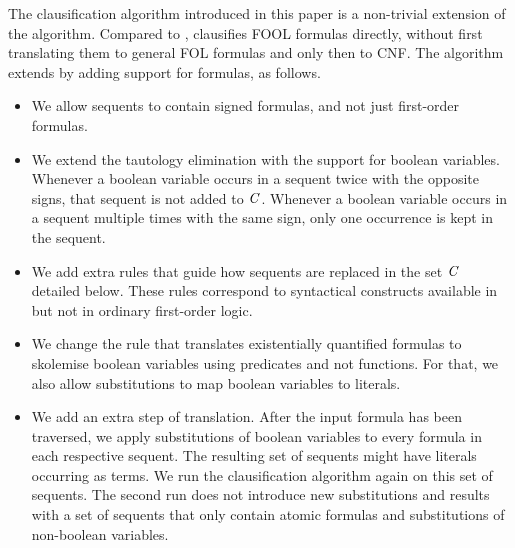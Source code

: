 The \nfcnf{} clausification algorithm introduced in this paper is a non-trivial extension of the \newcnf{} algorithm. 
Compared to \oldcnf{}, %
\nfcnf{} 
clausifies FOOL formulas directly, without first translating them to general FOL formulas and only then to CNF. 
The \nfcnf{} algorithm   extends \newcnf{} by adding support for \folb{} formulas, as follows. 
\begin{itemize}
  \item We allow sequents to contain signed \folb{} formulas, and not just first-order formulas.
  \item We extend the \newcnf{} tautology elimination with the support for boolean variables. Whenever a boolean variable occurs in a sequent twice with the opposite signs, that sequent is not added to $\mathit{C}$. Whenever a boolean variable occurs in a sequent multiple times with the same sign, only one occurrence is kept in the sequent.
  \item We add extra rules that guide how sequents are replaced in the set $\mathit{C}$ detailed below. These rules correspond to syntactical constructs available in \folb{} but not in ordinary first-order logic.
  \item We change the rule that translates existentially quantified formulas to sko\-le\-mi\-se boolean variables using \skolem{} predicates and not \skolem{} functions. For that, we also allow substitutions to map boolean variables to \skolem{} literals. 
  \item We add an extra step of translation. After the input formula has been traversed, we apply substitutions of boolean variables to every formula in each respective sequent. The resulting set of sequents might have \skolem{} literals occurring as terms. We run the clausification algorithm again on this set of sequents. The second run does not introduce new substitutions and results with a set of sequents that only contain atomic formulas and substitutions of non-boolean variables.
\end{itemize}


